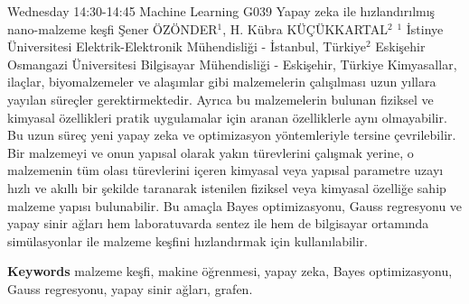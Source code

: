 
    \begin{abstract_basarim}
    {Wednesday 14:30-14:45}
    {Machine Learning}
    {G039}
    {Yapay zeka ile hızlandırılmış nano-malzeme keşfi}
    {%
    Şener ÖZÖNDER$^{1}$, H. Kübra KÜÇÜKKARTAL$^{2}$}
    {%
    }
    {%
    $^1$ İstinye Üniversitesi Elektrik-Elektronik Mühendisliği - İstanbul, Türkiye\newline{}$^2$ Eskişehir Osmangazi Üniversitesi Bilgisayar Mühendisliği - Eskişehir, Türkiye}
    Kimyasallar, ilaçlar, biyomalzemeler ve alaşımlar gibi malzemelerin çalışılması uzun yıllara yayılan süreçler gerektirmektedir. Ayrıca bu malzemelerin bulunan fiziksel ve kimyasal özellikleri pratik uygulamalar için aranan özelliklerle aynı olmayabilir. Bu uzun süreç yeni yapay zeka ve optimizasyon yöntemleriyle tersine çevrilebilir. Bir malzemeyi ve onun yapısal olarak yakın türevlerini çalışmak yerine, o malzemenin tüm olası türevlerini içeren kimyasal veya yapısal parametre uzayı hızlı ve akıllı bir şekilde taranarak istenilen fiziksel veya kimyasal özelliğe sahip malzeme yapısı bulunabilir. Bu amaçla Bayes optimizasyonu, Gauss regresyonu ve yapay sinir ağları hem laboratuvarda sentez ile hem de bilgisayar ortamında simülasyonlar ile malzeme keşfini hızlandırmak için kullanılabilir. 
    
        \textbf{Keywords} \newline{}malzeme keşfi, makine öğrenmesi, yapay zeka, Bayes optimizasyonu, Gauss regresyonu, yapay sinir ağları, grafen.
    \end{abstract_basarim}
    
